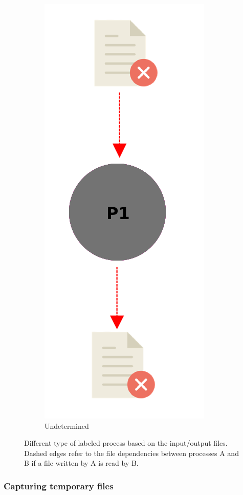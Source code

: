 \documentclass[a4paper,num-refs]{oup-contemporary}
\begin{document}
\begin{figure}
\begin{subfigure}{0.3\linewidth}
    \includegraphics[scale=0.36]{images/grey.png}
    \caption{Undetermined}
    \label{fig:grey}
\end{subfigure}
    \caption{Different type of labeled process based on the input/output files.
  Dashed edges refer to the file dependencies between processes A and B 
  if a file written by A is read by B.}
    \label{fig:processes}
\end{figure}

\subsubsection{Capturing temporary files} 
\end{document}

